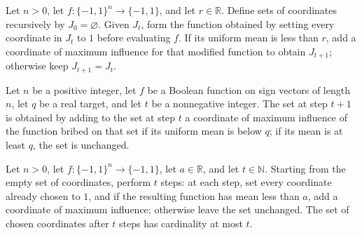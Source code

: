 \begin{definition}
\label{FABL.briberySetsTo}
\leanok
{}
Let $n>0$, let $f:\{−1,1\}^n\to\{−1,1\}$, and let $r\in\mathbb R$. Define sets of
coordinates recursively by $J_0=\varnothing$. Given $J_t$, form the function obtained by
setting every coordinate in $J_t$ to $1$ before evaluating $f$. If its uniform mean is
less than $r$, add a coordinate of maximum influence for that modified function to
obtain $J_{t+1}$; otherwise keep $J_{t+1}=J_t$.
\end{definition}

\begin{theorem}
\label{FABL.briberySetsTo_succ}
\leanok
{}
Let $n$ be a positive integer, let $f$ be a Boolean function on sign vectors of length
$n$, let $q$ be a real target, and let $t$ be a nonnegative integer. The set at step
$t+1$ is obtained by adding to the set at step $t$ a coordinate of maximum influence of
the function bribed on that set if its uniform mean is below $q$; if its mean is at
least $q$, the set is unchanged.
\end{theorem}

\begin{theorem}
\label{FABL.card_briberySetsTo_le}
\leanok
{}
Let $n>0$, let $f:\{-1,1\}^n\to\{-1,1\}$, let $a\in\mathbb R$, and let
$t\in\mathbb N$. Starting from the empty set of coordinates, perform $t$ steps: at
each step, set every coordinate already chosen to $1$, and if the resulting function has
mean less than $a$, add a coordinate of maximum influence; otherwise leave the set
unchanged. The set of chosen coordinates after $t$ steps has cardinality at most $t$.
\end{theorem}

